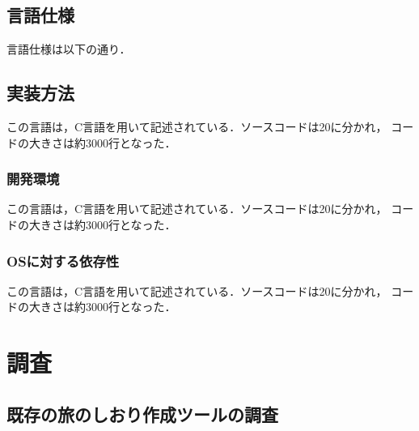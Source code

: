 \documentclass{funthesis}
\begin{document}
\section{言語仕様}

言語仕様は以下の通り．


\section{実装方法}

この言語は，C言語を用いて記述されている．ソースコードは20に分かれ，
コードの大きさは約3000行となった．

\subsection{開発環境}

この言語は，C言語を用いて記述されている．ソースコードは20に分かれ，
コードの大きさは約3000行となった．

\subsection{OSに対する依存性}

この言語は，C言語を用いて記述されている．ソースコードは20に分かれ，
コードの大きさは約3000行となった．


\chapter{調査}%

\section{既存の旅のしおり作成ツールの調査}
\end{document}
